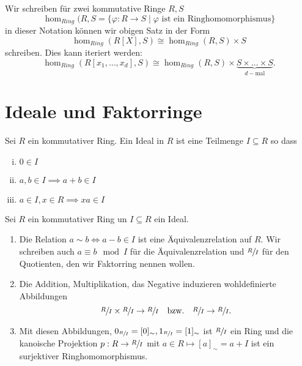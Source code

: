 \begin{notation}
	Wir schreiben für zwei kommutative Ringe $R,S$ 
	\[
		\hom_{Ring}(R,S = \{ \varphi: R \to S \mid \varphi \text{ ist ein Ringhomomorphismus}\} 
	\] 
	in dieser Notation können wir obigen Satz in der Form
	\[
		\hom_{Ring}(R[X],S) \cong \hom_{Ring}(R,S) \times S
	\] 
	schreiben. Dies kann iteriert werden:
	\[
		\hom_{Ring} (R[x_1,\ldots,x_{d}],S) \cong \hom_{Ring}(R,S) \times \underbrace{S\times \ldots \times S}_{d-\text{mal}}
	.\] 
\end{notation}




\section{Ideale und Faktorringe}

\begin{definition}
	Sei $R$ ein kommutativer Ring.
	Ein Ideal in $R$ ist eine Teilmenge $I \subseteq R$ so dass
	\begin{enumerate}[(i)]
		\item $0 \in I$ 
		\item $a,b \in I \implies a + b \in I$
		\item $a \in I, x \in R \implies xa \in I$
	\end{enumerate}
\end{definition}


\begin{theorem}
Sei $R$ ein kommutativer Ring un $I \subseteq R$ ein Ideal.
\begin{enumerate}
	\item Die Relation $a \sim b \Leftrightarrow a - b \in I$ ist eine Äquivalenzrelation auf $R$.
		Wir schreiben auch $a \equiv b \mod I$ für die Äquivalenzrelation und $\sfrac{R}{I}$ für den Quotienten, den wir Faktorring nennen wollen.
	\item Die Addition, Multiplikation, das Negative induzieren wohldefinierte Abbildungen
		\[
			\sfrac{R}{I} \times \sfrac{R}{I} \to \sfrac{R}{I} \qq{bzw.} \sfrac{R}{I} \to \sfrac{R}{I}
		.\] 
	\item Mit diesen Abbildungen, $0_{\sfrac{R}{I}} = [0]_{\sim}, 1_{\sfrac{R}{I}} = [1]_{\sim}$ ist $\sfrac{R}{I}$ ein Ring und die kanoische Projektion
		$p: R \to \sfrac{R}{I}$ mit $a \in R \mapsto [a]_{\sim} = a + I$ ist ein surjektiver Ringhomomorphismus.
\end{enumerate}
\end{theorem}



